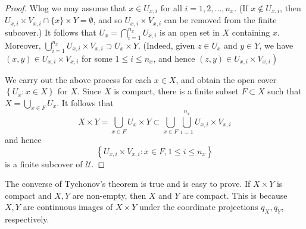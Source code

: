 \documentclass[a4paper]{article}
\begin{document}
\begin{proof}
Wlog we may assume that $x \in U_{x, i}$ for all $i=1,2, \ldots, n_{x}$. (If $x \notin U_{x, i}$, then $U_{x, i} \times V_{x, i} \cap\{x\} \times Y=\emptyset$, and so $U_{x, i} \times V_{x, i}$ can be removed from the finite subcover.) It follows that $U_{x}=\bigcap_{i=1}^{n_{x}} U_{x, i}$ is an open set in $X$ containing $x$. Moreover, $\bigcup_{i=1}^{n_{x}} U_{x, i} \times V_{x, i} \supset U_{x} \times Y$. (Indeed, given $z \in U_{x}$ and $y \in Y$, we have $(x, y) \in U_{x, i} \times V_{x, i}$ for some $1 \leqslant i \leqslant n_{x}$, and hence $\left.(z, y) \in U_{x, i} \times V_{x, i}\right)$

We carry out the above process for each $x \in X$, and obtain the open cover $\left\{U_{x}: x \in X\right\}$ for $X$. Since $X$ is compact, there is a finite subset $F \subset X$ such that $X=\bigcup_{x \in F} U_{x}$. It follows that
$$
X \times Y=\bigcup_{x \in F} U_{x} \times Y \subset \bigcup_{x \in F} \bigcup_{i=1}^{n_{x}} U_{x, i} \times V_{x, i}
$$
and hence
$$
\left\{U_{x, i} \times V_{x, i}: x \in F, 1 \leqslant i \leqslant n_{x}\right\}
$$
is a finite subcover of $\mathcal{U}$.
\end{proof}

\begin{remark}
    The converse of Tychonov's theorem is true and is easy to prove. If $X \times Y$ is compact and $X, Y$ are non-empty, then $X$ and $Y$ are compact. This is because $X, Y$ are continuous images of $X \times Y$ under the coordinate projections $q_{X}, q_{Y}$, respectively.
\end{remark}
\end{document}
